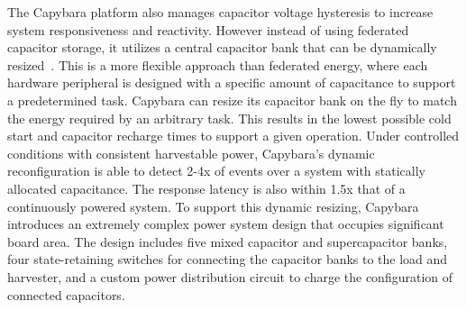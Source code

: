The Capybara platform also manages capacitor voltage hysteresis to increase system responsiveness and reactivity. However instead of using federated capacitor storage, it utilizes a central capacitor bank that can be dynamically resized~\cite{colinReconfigurable18}. 
This is a more flexible approach than federated energy, where each hardware peripheral is designed with a specific amount of capacitance to support a predetermined task. 
Capybara can resize its capacitor bank on the fly to match the energy required by an arbitrary task. This results in the lowest possible cold start and capacitor recharge times to support a given operation.
Under controlled conditions with consistent harvestable power, Capybara's dynamic reconfiguration is able to detect 2-4x of events over a system with statically allocated capacitance. The response latency is also within 1.5x that of a continuously powered system.
To support this dynamic resizing, Capybara introduces an extremely complex power system design that occupies significant board area. The design includes five mixed capacitor and supercapacitor banks, four state-retaining switches for connecting the capacitor banks to the load and harvester, and a custom power distribution circuit to charge the configuration of connected capacitors. 

